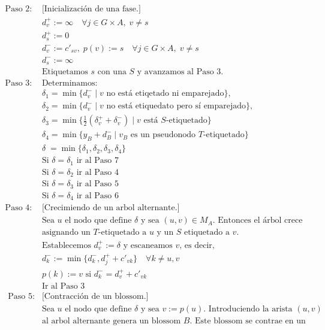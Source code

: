 \documentclass[twoside,a4paper,openright,12pt,tikz]{book}
\begin{document}
\begin{align*}
\text{Paso 2: }& \text{[Inicialización de una fase.]}\\
&d_v^+ := \infty \quad \forall j\in G\times A,\; v\neq s\\
&d_s^+:=0\\
&d_v^-:=c'_{sv},\;p(v):=s\quad \forall j\in G\times A,\; v\neq s\\
&d^-_s:=\infty\\
&\text{Etiquetamos $s$ con una $S$ y avanzamos al Paso 3.}\\
\text{Paso 3: }& \text{Determinamos:}\\
&\delta_1 = \min\{d_v^-\mid \text{$v$ no está etiqetado ni emparejado}\},\\
&\delta_2 =\min\{d_v^-\mid \text{$v$ no está etiquedato pero sí emparejado}\},\\
&\delta_3 =\min\{\frac{1}{2}(\delta_v^+ + \delta_v^-)\mid \text{$v$ está $S$-etiquetado}\}\\
&\delta_4 =\min\{y_B+d_B^- \mid \text{$v_B$ es un pseudonodo $T$-etiquetado}\}\\
&\delta\;= \min\{\delta_1,\delta_2,\delta_3,\delta_4\}\\
&\text{Si $\delta=\delta_1$ ir al Paso 7}\\
&\text{Si $\delta=\delta_2$ ir al Paso 4}\\
&\text{Si $\delta=\delta_3$ ir al Paso 5}\\
&\text{Si $\delta=\delta_4$ ir al Paso 6}\\
\text{Paso 4: }&\text{[Crecimiendo de un arbol alternante.]}\\
&\text{Sea $u$ el nodo que define $\delta$ y sea $(u,v)\in M_A$. Entonces el árbol crece}\\
&\text{asignando un $T$-etiquetado a $u$ y un $S$ etiquetado a $v$.}\\
&\text{Establecemos $d^+_v:=\delta$ y escaneamos $v$, es decir,}\\
&d^-_k:= \min\{d_k^-,d_j^++c'_{vk}\}\quad \forall k\neq u,v\\
&p(k):=v \text{ si } d_k^-= d_v^++c'_{vk}\\
&\text{Ir al Paso 3}\\
\text{ Paso 5: }&\text{[Contracción de un blossom.]}\\
&\text{Sea $u$ el nodo que define $\delta$ y sea $v:=p(u)$. Introduciendo la arista $(u,v)$}\\
&\text{al arbol alternante genera un blossom $B$. Este blossom se contrae en un}\\

\end{align*}
\end{document}
